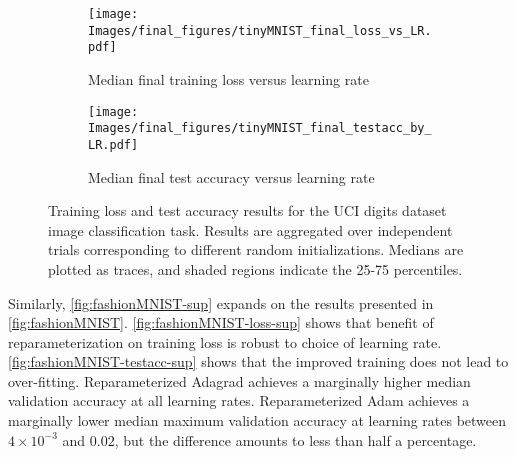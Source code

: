 \begin{figure*}[h!]
    \centering
    \begin{subfigure}[t]{0.45\textwidth}
        \centering
        \texttt{[image: Images/final\_figures/tinyMNIST\_final\_loss\_vs\_LR.pdf]}
        \caption{Median final training loss versus learning rate}
        \label{fig:tinyMNIST-loss-sup}
    \end{subfigure}
    \hspace{0.05\textwidth} %
    \begin{subfigure}[t]{0.45\textwidth}
        \centering
        \texttt{[image: Images/final\_figures/tinyMNIST\_final\_testacc\_by\_LR.pdf]}
        \caption{Median final test accuracy versus learning rate}
        \label{fig:tinyMNIST-testacc-sup}
    \end{subfigure}
    \caption{Training loss and test accuracy results for the UCI digits dataset image classification task. Results are aggregated over independent trials corresponding to different random initializations. Medians are plotted as traces, and shaded regions indicate the 25-75 percentiles.
    } \label{fig:tinyMNIST-sup}
\end{figure*}

Similarly, \cref{fig:fashionMNIST-sup} expands on the results presented in \cref{fig:fashionMNIST}. \cref{fig:fashionMNIST-loss-sup} shows that benefit of reparameterization on training loss is robust to choice of learning rate. \cref{fig:fashionMNIST-testacc-sup} shows that the improved training does not lead to over-fitting. Reparameterized Adagrad achieves a marginally higher median validation accuracy at all learning rates. Reparameterized Adam achieves a marginally lower median maximum validation accuracy at learning rates between $4\times 10^{-3}$ and $0.02$, but the difference amounts to less than half a percentage. 

